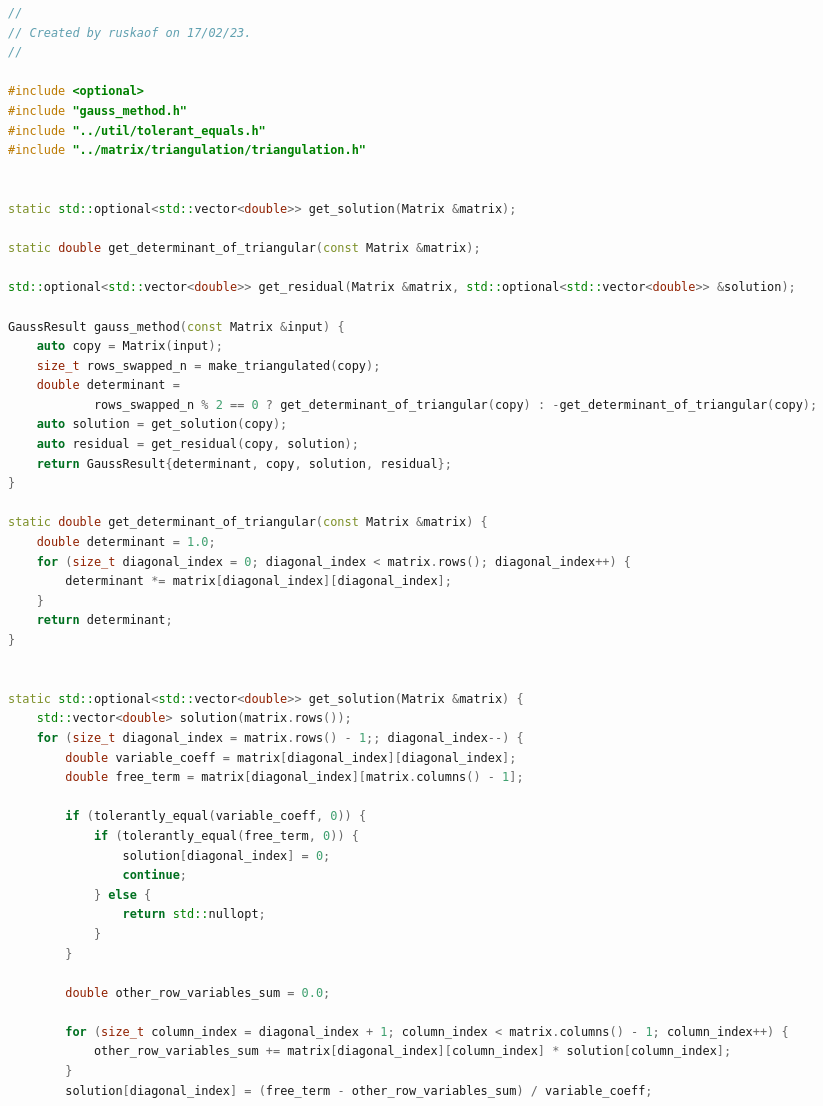 \documentclass[12pt]{article}
\begin{document}
\begin{adjustbox}{width=\textwidth, center}
\begin{lstlisting}[language=C++, caption=main.cpp]
//
// Created by ruskaof on 17/02/23.
//

#include <optional>
#include "gauss_method.h"
#include "../util/tolerant_equals.h"
#include "../matrix/triangulation/triangulation.h"


static std::optional<std::vector<double>> get_solution(Matrix &matrix);

static double get_determinant_of_triangular(const Matrix &matrix);

std::optional<std::vector<double>> get_residual(Matrix &matrix, std::optional<std::vector<double>> &solution);

GaussResult gauss_method(const Matrix &input) {
    auto copy = Matrix(input);
    size_t rows_swapped_n = make_triangulated(copy);
    double determinant =
            rows_swapped_n % 2 == 0 ? get_determinant_of_triangular(copy) : -get_determinant_of_triangular(copy);
    auto solution = get_solution(copy);
    auto residual = get_residual(copy, solution);
    return GaussResult{determinant, copy, solution, residual};
}

static double get_determinant_of_triangular(const Matrix &matrix) {
    double determinant = 1.0;
    for (size_t diagonal_index = 0; diagonal_index < matrix.rows(); diagonal_index++) {
        determinant *= matrix[diagonal_index][diagonal_index];
    }
    return determinant;
}


static std::optional<std::vector<double>> get_solution(Matrix &matrix) {
    std::vector<double> solution(matrix.rows());
    for (size_t diagonal_index = matrix.rows() - 1;; diagonal_index--) {
        double variable_coeff = matrix[diagonal_index][diagonal_index];
        double free_term = matrix[diagonal_index][matrix.columns() - 1];

        if (tolerantly_equal(variable_coeff, 0)) {
            if (tolerantly_equal(free_term, 0)) {
                solution[diagonal_index] = 0;
                continue;
            } else {
                return std::nullopt;
            }
        }

        double other_row_variables_sum = 0.0;

        for (size_t column_index = diagonal_index + 1; column_index < matrix.columns() - 1; column_index++) {
            other_row_variables_sum += matrix[diagonal_index][column_index] * solution[column_index];
        }
        solution[diagonal_index] = (free_term - other_row_variables_sum) / variable_coeff;



\end{lstlisting}
\end{adjustbox}
\end{document}

